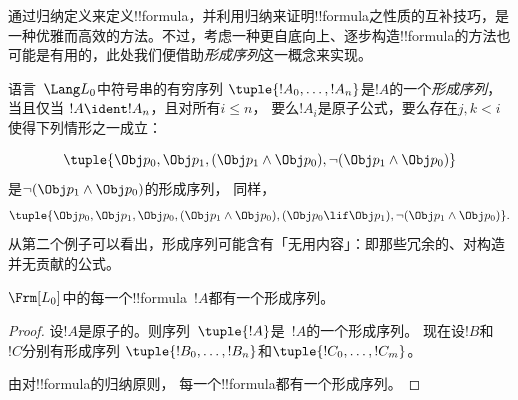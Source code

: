 \documentclass[../../../include/open-logic-section]{subfiles}
\begin{document}


通过归纳定义来定义!!{formula}，并利用归纳来证明!!{formula}之性质的互补技巧，是一种优雅而高效的方法。不过，考虑一种更自底向上、逐步构造!!{formula}的方法也可能是有用的，此处我们便借助\emph{形成序列}这一概念来实现。

\begin{defn}[公式的形成序列]
语言~$\Lang L_0$中符号串的有穷序列
$\tuple{!A_0,\dotsc,!A_n}$是$!A$的一个\emph{形成序列}，当且仅当
$!A \ident !A_n$，且对所有$i \leq n$，
要么$!A_i$是原子公式，要么存在$j,k < i$
使得下列情形之一成立：
\begin{enumerate}
\end{enumerate}
\end{defn}

\begin{ex}
\[
\tuple{
    \Obj p_0,
    \Obj p_1,
    (\Obj p_1 \land \Obj p_0),
    \lnot (\Obj p_1 \land \Obj p_0)
}
\]
是$\lnot (\Obj p_1 \land \Obj p_0)$的形成序列，
同样，
\[
\tuple{
    \Obj p_0,
    \Obj p_1,
    \Obj p_0,
    (\Obj p_1 \land \Obj p_0),
    (\Obj p_0 \lif \Obj p_1),
    \lnot (\Obj p_1 \land \Obj p_0)
}.
\]
%
从第二个例子可以看出，形成序列可能含有「无用内容」：即那些冗余的、对构造并无贡献的公式。
\end{ex}

\begin{prop}
$\Frm[L_0]$中的每一个!!{formula}~$!A$都有一个形成序列。
\end{prop}

\begin{proof}
设$!A$是原子的。则序列~$\tuple{!A}$是~$!A$的一个形成序列。
%
现在设$!B$和~$!C$分别有形成序列
$\tuple{!B_0,\dotsc,!B_n}$和$\tuple{!C_0,\dotsc,!C_m}$。
%
\begin{enumerate}
\end{enumerate}
由对!!{formula}的归纳原则，
每一个!!{formula}都有一个形成序列。
\end{proof}
\end{document}
